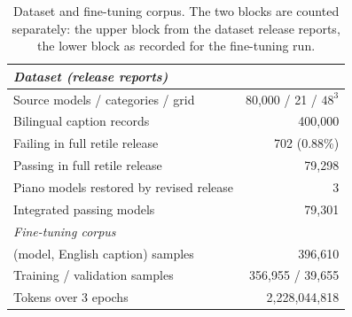 \begin{table}[t]
\centering
\small
\setlength{\tabcolsep}{4pt}
\begin{tabular}{lr}
\toprule
\multicolumn{2}{l}{\emph{Dataset (release reports)}} \\
\midrule
Source models / categories / grid & 80,000 / 21 / $48^3$ \\
Bilingual caption records & 400,000 \\
Failing in full retile release & 702 (0.88\%) \\
Passing in full retile release & 79,298 \\
Piano models restored by revised release & 3 \\
Integrated passing models & 79,301 \\
\midrule
\multicolumn{2}{l}{\emph{Fine-tuning corpus}} \\
\midrule
(model, English caption) samples & 396,610 \\ %
Training / validation samples & 356,955 / 39,655 \\
Tokens over 3 epochs & 2,228,044,818 \\ %
\bottomrule
\end{tabular}
\caption{Dataset and fine-tuning corpus. The two blocks are counted separately: the upper block from the dataset release reports, the lower block as recorded for the fine-tuning run.}
\label{tab:training-data}
\end{table}
